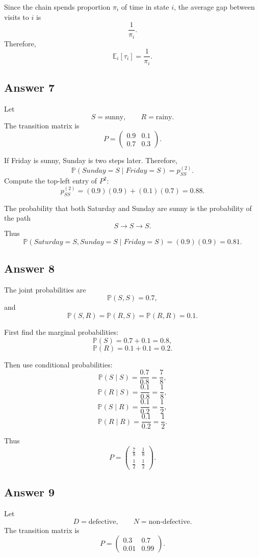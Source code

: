 \documentclass[12pt,a4paper]{article}
\theoremstyle{lecturestyle}
\newcommand{\Prob}{\mathbb{P}}
\newcommand{\E}{\mathbb{E}}
\begin{document}
Since the chain spends proportion $\pi_i$ of time in state $i$, the average gap between visits to $i$ is
\[
\frac1{\pi_i}.
\]
Therefore,
\[
\E_i[\tau_i]=\frac1{\pi_i}.
\]

\subsection*{Answer 7}

Let
\[
S=\text{sunny},\qquad R=\text{rainy}.
\]
The transition matrix is
\[
P=
\begin{pmatrix}
0.9 & 0.1\\
0.7 & 0.3
\end{pmatrix}.
\]

If Friday is sunny, Sunday is two steps later. Therefore,
\[
\Prob(Sunday=S\mid Friday=S)=p_{SS}^{(2)}.
\]
Compute the top-left entry of $P^2$:
\[
p_{SS}^{(2)}
=(0.9)(0.9)+(0.1)(0.7)
=0.88.
\]

The probability that both Saturday and Sunday are sunny is the probability of the path
\[
S\to S\to S.
\]
Thus
\[
\Prob(Saturday=S,Sunday=S\mid Friday=S)
=(0.9)(0.9)=0.81.
\]

\subsection*{Answer 8}

The joint probabilities are
\[
\Prob(S,S)=0.7,
\]
and
\[
\Prob(S,R)=\Prob(R,S)=\Prob(R,R)=0.1.
\]

First find the marginal probabilities:
\[
\Prob(S)=0.7+0.1=0.8,
\]
\[
\Prob(R)=0.1+0.1=0.2.
\]

Then use conditional probabilities:
\[
\Prob(S\mid S)=\frac{0.7}{0.8}=\frac78,
\]
\[
\Prob(R\mid S)=\frac{0.1}{0.8}=\frac18,
\]
\[
\Prob(S\mid R)=\frac{0.1}{0.2}=\frac12,
\]
\[
\Prob(R\mid R)=\frac{0.1}{0.2}=\frac12.
\]

Thus
\[
P=
\begin{pmatrix}
\frac78 & \frac18\\
\frac12 & \frac12
\end{pmatrix}.
\]

\subsection*{Answer 9}

Let
\[
D=\text{defective},\qquad N=\text{non-defective}.
\]
The transition matrix is
\[
P=
\begin{pmatrix}
0.3 & 0.7\\
0.01 & 0.99
\end{pmatrix}.
\]
\end{document}
